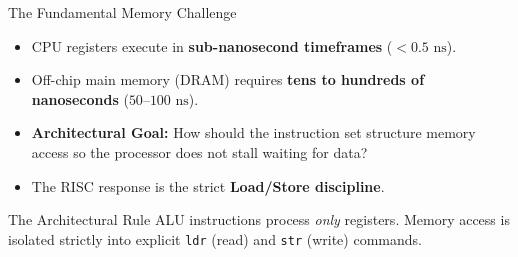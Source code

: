 \documentclass[aspectratio=169,11pt,t]{beamer}
\newcommand{\key}[1]{\textbf{#1}}
\newcommand{\code}[1]{\texttt{#1}}
\begin{document}
\begin{frame}{The Fundamental Memory Challenge}
\large
\begin{itemize}\setlength{\itemsep}{7pt}
  \item CPU registers execute in \key{sub-nanosecond timeframes} ($< 0.5\text{ ns}$).
  \item Off-chip main memory (DRAM) requires \key{tens to hundreds of nanoseconds} ($50\text{--}100\text{ ns}$).
  \item \key{Architectural Goal:} How should the instruction set structure memory access so the processor does not stall waiting for data?
  \item The RISC response is the strict \key{Load/Store discipline}.
\end{itemize}

\vspace{0.3cm}
\begin{block}{The Architectural Rule}
ALU instructions process \emph{only} registers. Memory access is isolated strictly into explicit \code{ldr} (read) and \code{str} (write) commands.
\end{block}
\end{frame}

\end{document}
